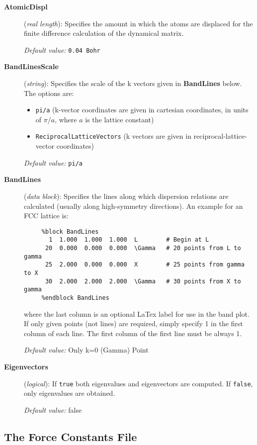 \begin{description}
\item[{\bf AtomicDispl}] ({\it real length}): 
Specifies the amount in which the atoms are displaced
for the finite difference calculation of the dynamical
matrix.

{\it Default value:} {\tt 0.04 Bohr}

\item[{\bf BandLinesScale}] ({\it string}): 
Specifies the scale of the k vectors given in {\bf BandLines} below.
The options are:
\begin{itemize}
\item {\tt pi/a} (k-vector coordinates are given in cartesian 
coordinates, in units of $\pi/a$, where $a$ is the lattice constant)
\item {\tt ReciprocalLatticeVectors} (k vectors are given in
reciprocal-lattice-vector coordinates)
\end{itemize}

{\it Default value:} {\tt pi/a}


\item[{\bf BandLines}] ({\it data block}): 
Specifies the lines along which dispersion relations are calculated
(usually along high-symmetry directions).
An example for an FCC lattice is:

\begin{verbatim}
     %block BandLines
       1  1.000  1.000  1.000  L        # Begin at L
      20  0.000  0.000  0.000  \Gamma   # 20 points from L to gamma
      25  2.000  0.000  0.000  X        # 25 points from gamma to X
      30  2.000  2.000  2.000  \Gamma   # 30 points from X to gamma
     %endblock BandLines
\end{verbatim}

where the last column is an optional LaTex label for use in the band plot.
If only given points (not lines) are required, simply specify 1 in the
first column of each line. The first column of the first line must be 
always 1.

{\it Default value:} {Only k=0 (Gamma) Point}

\item[{\bf Eigenvectors}] ({\it logical}): If {\tt true} both eigenvalues
and eigenvectors are computed. If {\tt false},  only eigenvalues
are obtained.

{\it Default value:} false

\end{description}


\subsection{The Force Constants File}

